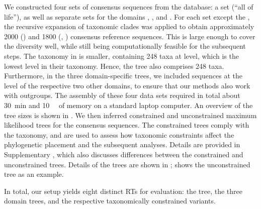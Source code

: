 We constructed four sets of consensus sequences from the  database:
a  set (``all of life''),
as well as separate sets for the domains , , and .
For each set except the , the recursive expansion of taxonomic clades was applied to obtain
approximately \num{2 000} ()
and \num{1800} (, ) consensus reference sequences.
This is large enough to cover the diversity well,
while still being computationally feasible for the subsequent steps.
The  taxonomy in  is smaller, containing \num{248} taxa at  level,
which is the lowest level in their taxonomy. Hence, the  tree also comprises \num{248} taxa.
Furthermore, in the three domain-specific trees,
we included sequences at the  level of the respective two other domains,
to ensure that our methods also work with outgroups.
The assembly of these four data sets required in total
about \SI{30}{\minute} and \SI{10}{\giga\byte} of memory on a standard laptop computer.
An overview of the tree sizes is shown in .
We then inferred constrained and unconstrained maximum likelihood trees for the consensus sequences.
The constrained trees comply with the  taxonomy,
and are used to assess how taxonomic constraints affect the phylogenetic placement and the subsequent analyses.
Details are provided
in Supplementary ,
which also discusses differences between the constrained and unconstrained trees.
Details of the trees are shown in ;
 shows the unconstrained  tree as an example.

In total, our setup yields eight distinct \acp{RT} for evaluation:
the  tree, the three domain trees, and the respective taxonomically constrained variants.


